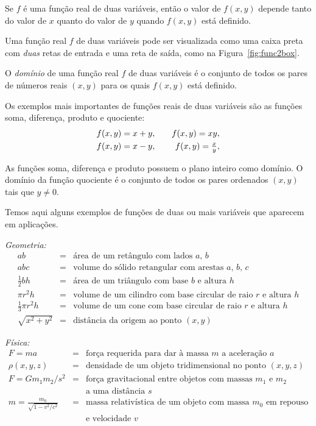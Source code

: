 Se $f$ é uma função real de duas variáveis, então o valor
de $f(x, y)$ depende tanto do valor de $x$ quanto do valor
de $y$ quando $f(x, y)$ está definido.

Uma função real $f$ de duas variáveis pode ser visualizada
como uma caixa preta com \emph{duas} retas de entrada e uma
reta de saída, como na Figura~\ref{fig:func2box}.


O \emph{domínio} de uma função real $f$ de duas variáveis é
o conjunto de todos os pares de números reais $(x, y)$ para os
quais $f(x, y)$ está definido.

Os exemplos mais importantes de funções reais de duas variáveis
são as funções soma, diferença, produto e quociente:
\begin{eqnarray*}
  f(x, y) = x+y, & \hspace{1em} & f(x, y) = xy, \\
  f(x, y) = x-y, & \hspace{1em} & \textstyle f(x, y) = \frac{x}{y},
\end{eqnarray*}

As funções soma, diferença e produto possuem o plano inteiro
como domínio. O domínio da função quociente é o conjunto de
todos os pares ordenados $(x, y)$ tais que $y \ne 0$.

Temos aqui alguns exemplos de funções de duas ou mais variáveis
que aparecem em aplicações.

\emph{Geometria:}
\begin{eqnarray*}
  ab & = & \text{área de um retângulo com lados $a$, $b$} \\
 abc & = & \text{volume do sólido retangular com arestas $a$, $b$, $c$} \\
\textstyle
\frac{1}{2}bh & = & \text{área de um triângulo com base $b$ e altura $h$} \\
\pi r^2 h & = & \text{volume de um cilindro com base circular de raio $r$ e altura $h$} \\
\textstyle
\frac{1}{3} \pi r^2 h & = & \text{volume de um cone com base circular
                            de raio $r$ e altura $h$} \\
\textstyle
\sqrt{x^2 + y^2} & = & \text{distância da origem ao ponto } (x, y)
\end{eqnarray*}

\emph{Física:}
\begin{eqnarray*}
 F = ma & = & \text{força requerida para dar à massa $m$ a aceleração $a$} \\
\rho(x, y, z) & = & \text{densidade de um objeto tridimensional no ponto $(x, y, z)$} \\
 F = G m_1 m_2 / s^2 & = &
    \text{força gravitacional entre objetos com massas $m_1$ e $m_2$} \\
                     &   &
    \text{a uma distância $s$}\\
 m = \frac{m_0}{\sqrt{1-v^2/c^2}} & = &
    \text{massa relativística de um objeto com massa $m_0$ em repouso} \\[-8pt]
                                  &   &
    \text{e velocidade $v$}
\end{eqnarray*}

